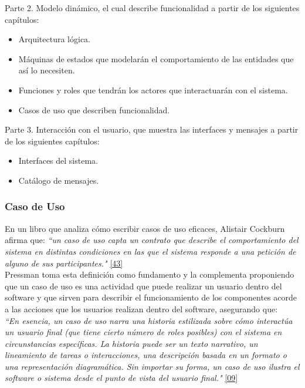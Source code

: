 Parte 2. Modelo dinámico, el cual describe funcionalidad a partir de los siguientes capítulos:
\begin{itemize}
	\item Arquitectura lógica.
	\item Máquinas de estados que modelarán el comportamiento de las entidades que así lo necesiten.
	\item Funciones y roles que tendrán los actores que interactuarán con el sistema.
	\item Casos de uso que describen funcionalidad.
\end{itemize}

Parte 3. Interacción con el usuario, que muestra las interfaces y mensajes a partir de los siguientes capítulos:
\begin{itemize}
	\item Interfaces del sistema.
	\item Catálogo de mensajes.
\end{itemize}


\subsubsection{Caso de Uso}

En un libro que analiza cómo escribir casos de uso eficaces, Alistair Cockburn afirma que: \textit { “un caso de uso capta un contrato que describe el comportamiento del sistema en distintas condiciones en las que el sistema responde a una petición de alguno de sus participantes."} \hyperlink{b43}{[43]}\\

Pressman toma esta definición como fundamento y la complementa proponiendo que un caso de uso es una actividad que puede realizar un usuario dentro del software y que sirven para describir el funcionamiento de los componentes acorde a las acciones que los usuarios realizan dentro del software, asegurando que:\\

\textit {``En esencia, un caso de uso narra una historia estilizada sobre cómo interactúa un usuario final (que tiene cierto número de roles posibles) con el sistema en circunstancias específicas. La historia puede ser un texto narrativo, un lineamiento de tareas o interacciones, una descripción basada en un formato o una representación diagramática. Sin importar su forma, un caso de uso ilustra el software o sistema desde el punto de vista del usuario final."} \hyperlink{b09}{[09]}\\

